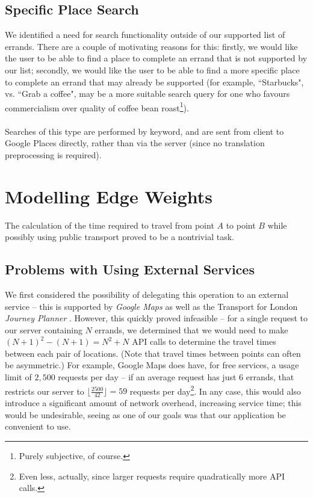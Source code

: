 \documentclass[a4paper, 10pt]{report}
\begin{document}
\subsection{Specific Place Search}
We identified a need for search functionality outside of our supported list of errands. There are a couple of motivating reasons for this: firstly, we would like the user to be able to find a place to complete an errand that is not supported by our list; secondly, we would like the user to be able to find a more specific place to complete an errand that may already be supported (for example, ``Starbucks", vs. ``Grab a coffee", may be a more suitable search query for one who favours commercialism over quality of coffee bean roast\footnote{Purely subjective, of course.}).
\\\\
Searches of this type are performed by keyword, and are sent from client to Google Places directly, rather than via the server (since no translation preprocessing is required).
\section{Modelling Edge Weights}
The calculation of the time required to travel from point $A$ to point $B$ while possibly using public transport proved to be a nontrivial task. 
\subsection{Problems with Using External Services}
We first considered the possibility of delegating this operation to an external service -- this is supported by \textit{Google Maps} \cite{google-maps} as well as the Transport for London \textit{Journey Planner} \cite{tfl-journey-planner}. However, this quickly proved infeasible -- for a single request to our server containing $N$ errands, we determined that we would need to make $(N + 1)^2 - (N + 1) = N^2 + N$ API calls to determine the travel times between each pair of locations. (Note that travel times between points can often be asymmetric.) For example, Google Maps does have, for free services, a usage limit of $2,500$ requests per day -- if an average request has just $6$ errands, that restricts our server to $\lfloor \frac{2500}{42} \rfloor = 59$ requests per day\footnote{Even less, actually, since larger requests require quadratically more API calls.}. In any case, this would also introduce a significant amount of network overhead, increasing service time; this would be undesirable, seeing as one of our goals was that our application be convenient to use.
\end{document}
